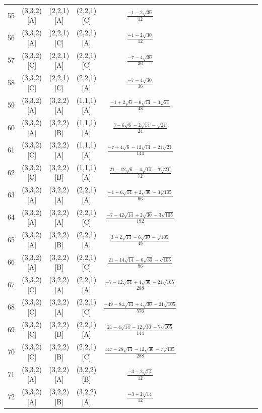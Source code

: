 \documentclass[11pt]{article}
\begin{document}
\begin{longtable}{ | p{1cm}| *{15}{c|} }
55 & (3,3,2)[A] & (2,2,1)[A] & (2,2,1)[C] & $\frac{-1-2\sqrt{30}}{12}$\\ %
56 & (3,3,2)[A] & (2,2,1)[C] & (2,2,1)[A] & $\frac{-1-2\sqrt{30}}{12}$\\ %
57 & (3,3,2)[C] & (2,2,1)[A] & (2,2,1)[C] & $\frac{-7-4\sqrt{30}}{36}$\\ %
58 & (3,3,2)[C] & (2,2,1)[C] & (2,2,1)[A] & $\frac{-7-4\sqrt{30}}{36}$\\ %
59 & (3,3,2)[A] & (3,2,2)[A] & (1,1,1)[A] & $\frac{-1+2\sqrt{6}-6\sqrt{14}-3\sqrt{21}}{48}$\\ %
60 & (3,3,2)[A] & (3,2,2)[B] & (1,1,1)[A] & $\frac{3-6\sqrt{6}-2\sqrt{14}-\sqrt{21}}{24}$\\ %
61 & (3,3,2)[C] & (3,2,2)[A] & (1,1,1)[A] & $\frac{-7+4\sqrt{6}-12\sqrt{14}-21\sqrt{21}}{144}$\\ %
62 & (3,3,2)[C] & (3,2,2)[B] & (1,1,1)[A] & $\frac{21-12\sqrt{6}-4\sqrt{14}-7\sqrt{21}}{72}$\\ %
63 & (3,3,2)[A] & (3,2,2)[A] & (2,2,1)[A] & $\frac{-1-6\sqrt{14}+2\sqrt{30}-3\sqrt{105}}{96}$\\ %
64 & (3,3,2)[A] & (3,2,2)[A] & (2,2,1)[C] & $\frac{-7-42\sqrt{14}+2\sqrt{30}-3\sqrt{105}}{192}$\\ %
65 & (3,3,2)[A] & (3,2,2)[B] & (2,2,1)[A] & $\frac{3-2\sqrt{14}-6\sqrt{30}-\sqrt{105}}{48}$\\ %
66 & (3,3,2)[A] & (3,2,2)[B] & (2,2,1)[C] & $\frac{21-14\sqrt{14}-6\sqrt{30}-\sqrt{105}}{96}$\\ %
67 & (3,3,2)[C] & (3,2,2)[A] & (2,2,1)[A] & $\frac{-7-12\sqrt{14}+4\sqrt{30}-21\sqrt{105}}{288}$\\ %
68 & (3,3,2)[C] & (3,2,2)[A] & (2,2,1)[C] & $\frac{-49-84\sqrt{14}+4\sqrt{30}-21\sqrt{105}}{576}$\\ %
69 & (3,3,2)[C] & (3,2,2)[B] & (2,2,1)[A] & $\frac{21-4\sqrt{14}-12\sqrt{30}-7\sqrt{105}}{144}$\\ %
70 & (3,3,2)[C] & (3,2,2)[B] & (2,2,1)[C] & $\frac{147-28\sqrt{14}-12\sqrt{30}-7\sqrt{105}}{288}$\\ %
71 & (3,3,2)[A] & (3,2,2)[A] & (3,2,2)[B] & $\frac{-3-2\sqrt{14}}{12}$\\ %
72 & (3,3,2)[A] & (3,2,2)[B] & (3,2,2)[A] & $\frac{-3-2\sqrt{14}}{12}$\\ %

\end{longtable}
\end{document}
